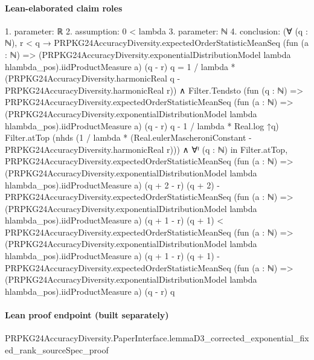 \documentclass[10pt]{article}
\begin{document}
\paragraph{Lean-elaborated claim roles}\begin{ReviewVerbatim}
1. parameter: ℝ
2. assumption: 0 < lambda
3. parameter: ℕ
4. conclusion: (∀ (q : ℕ),
    r < q →
      PRPKG24AccuracyDiversity.expectedOrderStatisticMeanSeq
          (fun (a : ℕ) =>
            (PRPKG24AccuracyDiversity.exponentialDistributionModel lambda hlambda_pos).iidProductMeasure a)
          (q - r) q =
        1 / lambda * (PRPKG24AccuracyDiversity.harmonicReal q - PRPKG24AccuracyDiversity.harmonicReal r)) ∧
  Filter.Tendsto
      (fun (q : ℕ) =>
        PRPKG24AccuracyDiversity.expectedOrderStatisticMeanSeq
            (fun (a : ℕ) =>
              (PRPKG24AccuracyDiversity.exponentialDistributionModel lambda hlambda_pos).iidProductMeasure a)
            (q - r) q -
          1 / lambda * Real.log ↑q)
      Filter.atTop (nhds (1 / lambda * (Real.eulerMascheroniConstant - PRPKG24AccuracyDiversity.harmonicReal r))) ∧
    ∀ᶠ (q : ℕ) in Filter.atTop,
      PRPKG24AccuracyDiversity.expectedOrderStatisticMeanSeq
            (fun (a : ℕ) =>
              (PRPKG24AccuracyDiversity.exponentialDistributionModel lambda hlambda_pos).iidProductMeasure a)
            (q + 2 - r) (q + 2) -
          PRPKG24AccuracyDiversity.expectedOrderStatisticMeanSeq
            (fun (a : ℕ) =>
              (PRPKG24AccuracyDiversity.exponentialDistributionModel lambda hlambda_pos).iidProductMeasure a)
            (q + 1 - r) (q + 1) <
        PRPKG24AccuracyDiversity.expectedOrderStatisticMeanSeq
            (fun (a : ℕ) =>
              (PRPKG24AccuracyDiversity.exponentialDistributionModel lambda hlambda_pos).iidProductMeasure a)
            (q + 1 - r) (q + 1) -
          PRPKG24AccuracyDiversity.expectedOrderStatisticMeanSeq
            (fun (a : ℕ) =>
              (PRPKG24AccuracyDiversity.exponentialDistributionModel lambda hlambda_pos).iidProductMeasure a)
            (q - r) q
\end{ReviewVerbatim}

\paragraph{Lean proof endpoint (built separately)}\begin{ReviewVerbatim}
PRPKG24AccuracyDiversity.PaperInterface.lemmaD3_corrected_exponential_fixed_rank_sourceSpec_proof
\end{ReviewVerbatim}
\end{document}
